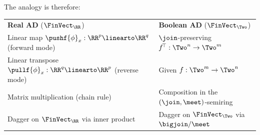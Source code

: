 The analogy is therefore:

\begin{center}
\begin{tabular}{ll}
 \textbf{Real AD} ($\FinVect_\RR$) & \textbf{Boolean AD} ($\FinVect_\Two$) \\
 Linear map $\pushf{\phi}_x: \RR^p \linearto \RR^q$ (forward mode) & $\join$-preserving $f^{\!\top}: \Two^n \to \Two^m$ \\
 Linear transpose $\pullf{\phi}_x: \RR^q \linearto \RR^p$ (reverse mode) & Given $f: \Two^m \to \Two^n$ \\
 Matrix multiplication (chain rule) & Composition in the $(\join, \meet)$-semiring \\
 Dagger on $\FinVect_\RR$ via inner product & Dagger on $\FinVect_\Two$ via $\bigjoin / \meet$ \\
\end{tabular}
\end{center}
